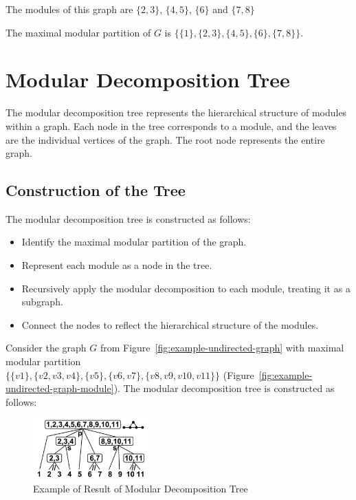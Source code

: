 The modules of this graph are $\{2, 3\}$, $\{4, 5\}$, $\{6\}$ and $\{7, 8\}$

The maximal modular partition of $G$ is $\{\{1\}, \{2, 3\}, \{4, 5\}, \{6\}, \{7, 8\}\}$.


\section{Modular Decomposition Tree}\label{sec:modular-decomposition-tree}

The modular decomposition tree represents the hierarchical structure of modules within a graph.
Each node in the tree corresponds to a module, and the leaves are the individual vertices of the graph.
The root node represents the entire graph.

\subsection*{Construction of the Tree}\label{subsec:construction-of-the-tree}

The modular decomposition tree is constructed as follows:

\begin{itemize}
    \item Identify the maximal modular partition of the graph.
    \item Represent each module as a node in the tree.
    \item Recursively apply the modular decomposition to each module, treating it as a subgraph.
    \item Connect the nodes to reflect the hierarchical structure of the modules.
\end{itemize}


\begin{Example}
    Consider the graph $G$ from Figure~\ref{fig:example-undirected-graph} with maximal modular partition \\ $\{\{v1\}, \{v2, v3, v4\}, \{v5\}, \{v6, v7\}, \{v8, v9, v10, v11\}\}$ (Figure~\ref{fig:example-undirected-graph-module}).
    The modular decomposition tree is constructed as follows:

    \begin{figure}[!h]
        \centering
        \includegraphics[width=0.40\textwidth]{images/graphs/undirected_graph_wikipedia_modular_decomposition}
        \caption{Example of Result of Modular Decomposition Tree}
        \label{fig:example-undirected-graph-modular-decomposition-tree}
    \end{figure}
\end{Example}


